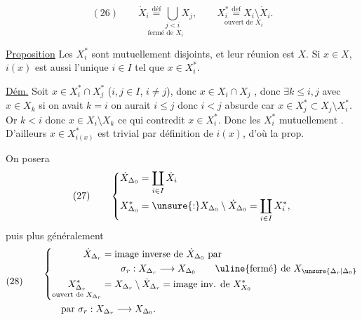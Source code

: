 \[
(26)\qquad
\underset{\text{fermé de }X_i}{\dot X_i\overset{\text{déf}}=\bigcup_{j<i}X_j},
\qquad
\underset{\text{ouvert de }X_i}{X_i^*\overset{\mathrm{def}}=X_i\setminus\dot X_i}.
\]


\uline{Proposition} Les $X_i^*$ sont mutuellement disjoints, et leur réunion est $X$. Si $x\in X$, $i(x)$ est aussi l'unique $i\in I$ tel que $x\in X_i^*$.

\uline{Dém.} Soit $x\in X_i^*\cap X_j^*$ ($i,j\in I$, $i\ne j$), donc  $x\in X_i\cap X_j$ , donc $\exists k\leq i,j$ avec
$x\in X_k$ si on avait $k=i$ on aurait $i\leq j$ donc $i<j$ absurde car $x\in X_j^*\subset X_j\setminus X_i^*$.
Or $k<i$ donc $x\in X_i\setminus X_k$ ce qui contredit $x\in X_i^*$. Donc les $X_i^*$ mutuellement . D'ailleurs $x\in X_{i(x)}^*$ est trivial par définition de $i(x)$, d'où la prop.

On posera
\[
(27)\qquad
\left\{\begin{aligned}
\dot X_{\Delta_0}&=\coprod_{i\in I}\dot X_i\\
X_{\Delta_0}^*&=\unsure{:}X_{\Delta_0}\setminus\dot X_{\Delta_0}=\coprod_{i\in I}X_i^*,
\end{aligned}\right.
\]
puis  plus généralement
\[
(28)\qquad
\begin{aligned}
&\left\{\begin{aligned}
\dot X_{\Delta_r}&=\text{image inverse de }\dot X_{\Delta_0}\text{ par}\\
&\qquad\sigma_r:X_{\Delta_r}\longrightarrow X_{\Delta_0}
\qquad\text{\uline{fermé} de }X_{\unsure{\Delta_r|\Delta_0}}\\
\underset{\text{ouvert de }X_{\Delta_r}}{X_{\Delta_r}^*}&=X_{\Delta_r}\setminus\dot X_{\Delta_r}=\text{image inv. de }X_{X_0}^*
\end{aligned}\right.\\
&\qquad\text{par }\sigma_r:X_{\Delta_r}\longrightarrow X_{\Delta_0}.
\end{aligned}
\]
